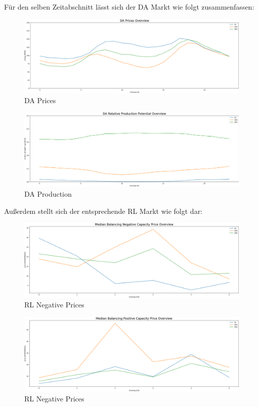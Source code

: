 Für den selben Zeitabschnitt lässt sich der DA Markt wie folgt zusammenfassen:
\begin{figure}[H]
	\centering
	\includegraphics[width=1\linewidth]{pictures/results/DAPrices.png}
	\caption{DA Prices}
	\label{fig:DAPrices}
\end{figure}
\begin{figure}
	\includegraphics[width=1\linewidth]{pictures/results/DAProd.png}
	\caption{DA Production}
	\label{fig:DAProd}
\end{figure}

Außerdem stellt sich der entsprechende RL Markt wie folgt dar:

\begin{figure}[H]
	\centering
	\includegraphics[width=1\linewidth]{pictures/results/RL_negPrice_Overview.png}
	\caption{RL Negative Prices}
	\label{fig:RL_negPrice_Overview}
\end{figure}
\begin{figure}
	\includegraphics[width=1\linewidth]{pictures/results/RL_posPrice_Overview.png}
	\caption{RL Negative Prices}
	\label{fig:RL_posPrice_Overview}
\end{figure}

